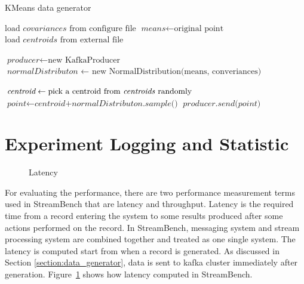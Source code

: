 \begin{algorithm}
\caption{KMeans data generator}\label{euclid}
\label{alg:kmeans_generator}
\begin{algorithmic}[1]
\State $\text{load } \textit{covariances} \text{ from configure file}$
\State $\textit{means} \gets \text{original point}$
\State $\text{load } \textit{centroids} \text{ from external file}$

\State $\textit{producer} \gets \text{new KafkaProducer}$ 
\State $\textit{normalDistributon } \gets \text{ new NormalDistribution(means, converiances)}$

\State $\textit{centroid} \gets \text{pick a centroid from \textit{centroids} randomly}$ 
\State $\textit{point} \gets \textit{centroid+normalDistributon.sample()}$ 
\State $\textit{producer.send(point)}$ 

\EndWhile
\end{algorithmic}
\end{algorithm}


\section{Experiment Logging and Statistic}

\label{section:log_statistic}
\begin{figure}
  \begin{center}
   \caption{Latency}
   \label{fig:latency}
  \end{center}
\end{figure}

For evaluating the performance, there are two performance measurement terms used in StreamBench that are latency and throughput. Latency is the required time from a record entering the system to some results produced after some actions performed on the record. In StreamBench, messaging system and stream processing system are combined together and treated as one single system. The latency is computed start from when a record is generated. As discussed in Section \ref{section:data_generator}, data is sent to kafka cluster immediately after generation. Figure~\ref{fig:latency} shows how latency computed in StreamBench. 

